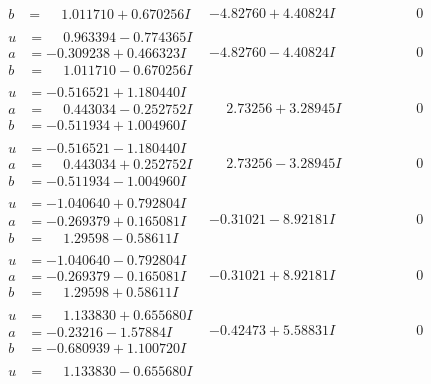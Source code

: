 \documentclass[1p]{elsarticle_modified}
\theoremstyle{definition}
\begin{document}
$$\begin{array}{c|c|c}
\begin{aligned}
b &= \phantom{-}1.011710 + 0.670256 I\end{aligned}
 & -4.82760 + 4.40824 I & \phantom{-0.000000 } 0 \\ \hline\begin{aligned}
u &= \phantom{-}0.963394 - 0.774365 I \\
a &= -0.309238 + 0.466323 I \\
b &= \phantom{-}1.011710 - 0.670256 I\end{aligned}
 & -4.82760 - 4.40824 I & \phantom{-0.000000 } 0 \\ \hline\begin{aligned}
u &= -0.516521 + 1.180440 I \\
a &= \phantom{-}0.443034 - 0.252752 I \\
b &= -0.511934 + 1.004960 I\end{aligned}
 & \phantom{-}2.73256 + 3.28945 I & \phantom{-0.000000 } 0 \\ \hline\begin{aligned}
u &= -0.516521 - 1.180440 I \\
a &= \phantom{-}0.443034 + 0.252752 I \\
b &= -0.511934 - 1.004960 I\end{aligned}
 & \phantom{-}2.73256 - 3.28945 I & \phantom{-0.000000 } 0 \\ \hline\begin{aligned}
u &= -1.040640 + 0.792804 I \\
a &= -0.269379 + 0.165081 I \\
b &= \phantom{-}1.29598 - 0.58611 I\end{aligned}
 & -0.31021 - 8.92181 I & \phantom{-0.000000 } 0 \\ \hline\begin{aligned}
u &= -1.040640 - 0.792804 I \\
a &= -0.269379 - 0.165081 I \\
b &= \phantom{-}1.29598 + 0.58611 I\end{aligned}
 & -0.31021 + 8.92181 I & \phantom{-0.000000 } 0 \\ \hline\begin{aligned}
u &= \phantom{-}1.133830 + 0.655680 I \\
a &= -0.23216 - 1.57884 I \\
b &= -0.680939 + 1.100720 I\end{aligned}
 & -0.42473 + 5.58831 I & \phantom{-0.000000 } 0 \\ \hline\begin{aligned}
u &= \phantom{-}1.133830 - 0.655680 I \\

\end{aligned}
\end{array}$$
\end{document}
